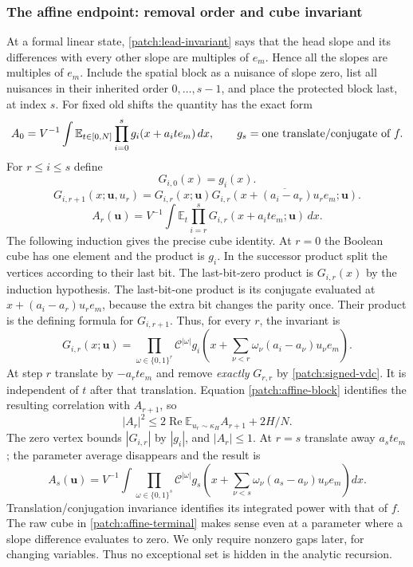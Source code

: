 \documentclass[11pt]{article}
\theoremstyle{definition}
\begin{document}
\subsubsection{The affine endpoint: removal order and cube invariant}
At a formal linear state, \eqref{patch:lead-invariant} says that the head slope and its differences
with every other slope are multiples of $e_m$.  Hence all the slopes are multiples of $e_m$.
Include the spatial block as a nuisance of slope zero, list all nuisances in their inherited
order $0,\ldots,s-1$, and place the protected block last, at index $s$.
For fixed old shifts the quantity has the exact form
\[
 A_0=V^{-1}\int\mathbb E_{t\in[0,N]}\prod_{i=0}^{s}g_i(x+a_it e_m)\,dx,
 \qquad g_s=\hbox{one translate/conjugate of }f.
\]
For $r\leq i\leq s$ define
\[
 G_{i,0}(x)=g_i(x).
\]
\[
 \label{patch:affine-block}
 G_{i,r+1}(x;\mathbf u,u_r)=G_{i,r}(x;\mathbf u)
     \overline{G_{i,r}(x+(a_i-a_r)u_re_m;\mathbf u)}.
 \tag{\theequation}
\]
\[
 A_r(\mathbf u)=V^{-1}\int\mathbb E_t
           \prod_{i=r}^sG_{i,r}(x+a_it e_m;\mathbf u)\,dx.
\]
The following induction gives the precise cube identity. At $r=0$ the Boolean cube has
one element and the product is $g_i$. In the successor product split the vertices according
to their last bit. The last-bit-zero product is $G_{i,r}(x)$ by the induction hypothesis.
The last-bit-one product is its conjugate evaluated at $x+(a_i-a_r)u_re_m$, because the
extra bit changes the parity once. Their product is the defining formula for $G_{i,r+1}$.
Thus, for every $r$, the invariant is
\[
 \label{patch:affine-cube-invariant}
 G_{i,r}(x;\mathbf u)=\prod_{\omega\in\{0,1\}^r}\mathcal C^{|\omega|}
        g_i\left(x+\sum_{\nu<r}\omega_\nu(a_i-a_\nu)u_\nu e_m\right).
 \tag{\theequation}
\]
At step $r$ translate by $-a_rt e_m$ and remove \emph{exactly} $G_{r,r}$ by
\cref{patch:signed-vdc}.  It is independent of $t$ after that translation.
Equation \eqref{patch:affine-block} identifies the resulting correlation with $A_{r+1}$, so
\[
 |A_r|^2\leq2\operatorname{Re}\mathbb E_{u_r\sim\kappa_H}A_{r+1}+2H/N.
\]
The zero vertex bounds $|G_{i,r}|$ by $|g_i|$, and $|A_r|\leq1$.
At $r=s$ translate away $a_st e_m$; the parameter average disappears and the result is
\[
 \label{patch:affine-terminal}
 A_s(\mathbf u)=V^{-1}\int
     \prod_{\omega\in\{0,1\}^s}\mathcal C^{|\omega|}
         g_s\left(x+\sum_{\nu<s}\omega_\nu(a_s-a_\nu)u_\nu e_m\right)dx.
 \tag{\theequation}
\]
Translation/conjugation invariance identifies its integrated power with that of $f$.
The raw cube in \eqref{patch:affine-terminal} makes sense even at a parameter where a slope
difference evaluates to zero.  We only require nonzero gaps later, for changing variables.
Thus no exceptional set is hidden in the analytic recursion.
\end{document}
